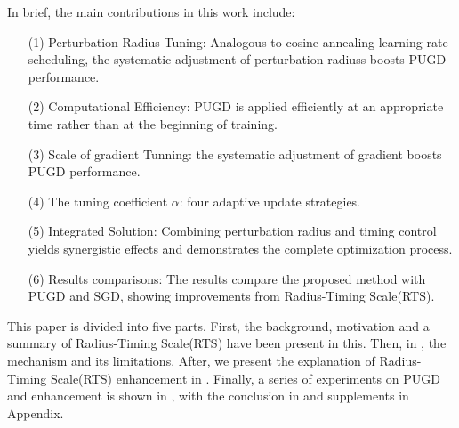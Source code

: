\documentclass[10pt,twocolumn,letterpaper]{article}
\begin{document}
In brief, the main contributions in this work include: 
\begin{enumerate}
    \item[(1)] Perturbation Radius Tuning: Analogous to cosine annealing learning rate scheduling, the systematic adjustment of perturbation radiuss boosts PUGD performance.
    \item[(2)] Computational Efficiency: PUGD is applied efficiently at an appropriate time rather than at the beginning of training. 
    \item[(3)] Scale of gradient Tunning: the systematic adjustment of gradient boosts PUGD performance.
    \item[(4)] The tuning coefficient $\alpha$: four adaptive update strategies.
    \item[(5)] Integrated Solution: Combining perturbation radius and timing control yields synergistic effects and demonstrates the complete optimization process. 
    \item[(6)] Results comparisons: The results compare the proposed method with PUGD and SGD, showing improvements from Radius-Timing Scale(RTS). 
\end{enumerate}
This paper is divided into five parts. First, the background, motivation and a summary of Radius-Timing Scale(RTS) have been present in this. Then, in , the mechanism and its limitations. After, we present the explanation of Radius-Timing Scale(RTS) enhancement in . Finally, a series of experiments on PUGD and enhancement is shown in , with the conclusion in  and supplements in Appendix. 
\end{document}
